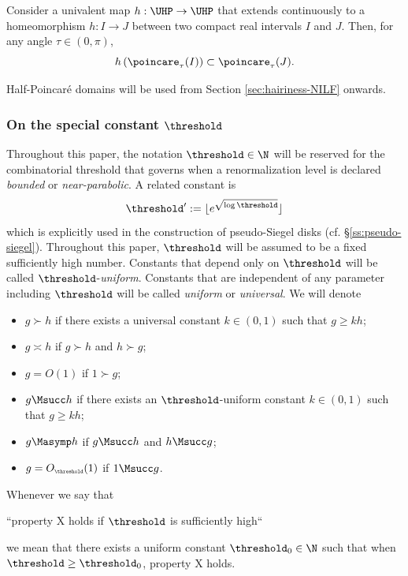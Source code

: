 \documentclass{amsart}
\begin{document}
\begin{lemma}
    Consider a univalent map $h: \UHP \to \UHP$ that extends continuously to a homeomorphism $h: I \to J$ between two compact real intervals $I$ and $J$.
    Then, for any angle $\tau \in (0,\pi)$,
    \[
        h\left( \poincare_\tau (I) \right) \subset \poincare_\tau (J).
    \]
\end{lemma}

Half-Poincar\'e domains will be used from Section \ref{sec:hairiness-NILF} onwards.

\subsubsection{On the special constant $\threshold$}
\label{sss:threshold}

Throughout this paper, the notation $\threshold \in \N$ will be reserved for the combinatorial threshold that governs when a renormalization level is declared \emph{bounded} or \emph{near-parabolic}.
A related constant is 
\[
\threshold' := \lfloor e^{\sqrt{\log\threshold}} \rfloor
\]
which is explicitly used in the construction of pseudo-Siegel disks (cf. \S\ref{ss:pseudo-siegel}). 
Throughout this paper, $\threshold$ will be assumed to be a fixed sufficiently high number.
Constants that depend only on $\threshold$ will be called $\threshold$-\emph{uniform}.
Constants that are independent of any parameter including $\threshold$ will be called \emph{uniform} or \emph{universal}.
We will denote 
\begin{itemize}
    \item $g \succ h$ if there exists a universal constant $k \in (0,1)$ such that $g \geq k h$;
    \item $g \asymp h$ if $g \succ h$ and $h \succ g$;
    \item $g = O(1)$ if $1 \succ g$;
    \item $g \Msucc h$ if there exists an $\threshold$-uniform constant $k \in (0,1)$ such that $g \geq k h$;
    \item $g \Masymp h$ if $g \Msucc h$ and $h \Msucc g$;
    \item $g = O_{\scriptscriptstyle \threshold}(1)$ if $1 \Msucc g$.
\end{itemize}
Whenever we say that 
\begin{center}
    ``property X holds if $\threshold$ is sufficiently high``
\end{center}
we mean that there exists a uniform constant $\threshold_0 \in \N$ such that when $\threshold \geq \threshold_0$, property X holds.
\end{document}
